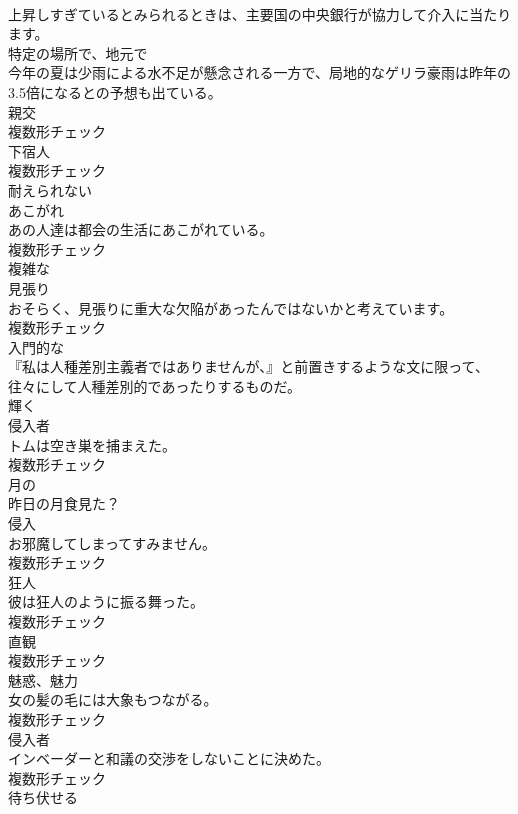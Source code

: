 \documentclass[8pt]{extreport}
\begin{document}
\begin{CJK}{UTF8}{min}
\\	上昇しすぎているとみられるときは、主要国の中央銀行が協力して介入に当たります。	
\\	[副詞]	特定の場所で、地元で	
\\	今年の夏は少雨による水不足が懸念される一方で、局地的なゲリラ豪雨は昨年の3.5倍になるとの予想も出ている。	
\\	[名詞]	親交	
\\	複数形チェック
\\	[名詞]	下宿人	
\\	複数形チェック
\\	[形容詞]	耐えられない	
\\	[名詞]	あこがれ	
\\	あの人達は都会の生活にあこがれている。	
\\	複数形チェック
\\	[形容詞]	複雑な	
\\	[名詞]	見張り	
\\	おそらく、見張りに重大な欠陥があったんではないかと考えています。	
\\	複数形チェック
\\	[形容詞]	入門的な	
\\	『私は人種差別主義者ではありませんが、』と前置きするような文に限って、往々にして人種差別的であったりするものだ。	
\\	[形容詞]	輝く	
\\	[名詞]	侵入者	
\\	トムは空き巣を捕まえた。	
\\	複数形チェック
\\	[形容詞]	月の	
\\	昨日の月食見た？	
\\	[名詞]	侵入	
\\	お邪魔してしまってすみません。	
\\	複数形チェック
\\	[名詞]	狂人	
\\	彼は狂人のように振る舞った。	
\\	複数形チェック
\\	[名詞]	直観	
\\	複数形チェック
\\	[名詞]	魅惑、魅力	
\\	女の髪の毛には大象もつながる。	
\\	複数形チェック
\\	[名詞]	侵入者	
\\	インベーダーと和議の交渉をしないことに決めた。	
\\	複数形チェック
\\	[動詞]	待ち伏せる	

\end{CJK}
\end{document}
